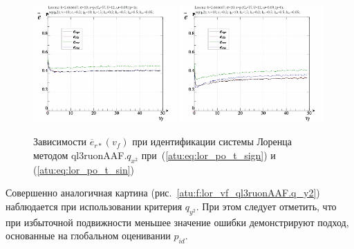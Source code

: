 \begin{figure}[ht!]
  \centerline{
    \includegraphics[width=0.49\textwidth]{p/cha/lor/ql3ruonAAF/lor_ql3ruonAAF_qx2-p_v_f_e_sign.png}
    \hfill
    \includegraphics[width=0.49\textwidth]{p/cha/lor/ql3ruonAAF/lor_ql3ruonAAF_qx2-p_v_f_e_sin.png}
  }
  \caption{Зависимости $\overline{e}_{r*}(v_f)$ при идентификации системы Лоренца методом ql3ruonAAF.$q_{x^2}$
   при~(\ref{atu:eq:lor_po_t_sign}) и (\ref{atu:eq:lor_po_t_sin})}
  \label{atu:f:lor_vf_ql3ruonAAF.q_x2}
\end{figure}

Совершенно аналогичная картина
(рис.~\ref{atu:f:lor_vf_ql3ruonAAF.q_y2})
наблюдается при использовании критерия $q_{y^2}$.
При этом следует отметить, что при избыточной подвижности
меньшее значение ошибки демонстрируют
подход, основанные на глобальном оценивании $p_{id}$.


